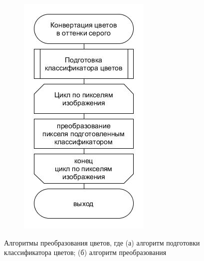 \documentclass[t]{beamer}
\begin{document}
\begin{frame}
\begin{figure}[ht!]
\begin{subfigure}{.21\textwidth}
				\includegraphics[width = \textwidth]{image/chapter_2/colorclassification2}
				\caption{}
			\end{subfigure}
			\centering
			\caption{Алгоритмы преобразования цветов, где (а) алгоритм подготовки классификатора цветов; (б) алгоритм преобразования}
			\label{fig:Examples}
		\end{figure}
		
	\end{frame}
\end{document}

